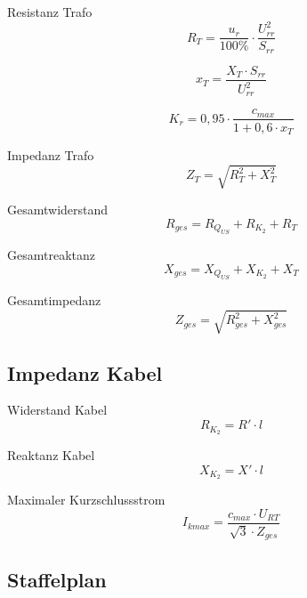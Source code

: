 \documentclass[11pt, a4paper, draft, fleqn, twocolumn]{article}
\numberwithin{equation}{subsection}
\begin{document}
\noindent Resistanz Trafo
\begin{equation}
    R_T = \frac{u_r}{100\%} \cdot \frac{U_{rr}^2}{S_{rr}}
\end{equation}

\noindent 
\begin{equation}
    x_T = \frac{X_T \cdot S_{rr}}{U_{rr}^2}
\end{equation}

\noindent
\begin{equation}
    K_r = 0,95 \cdot \frac{c_{max}}{1 + 0,6 \cdot x_T}
\end{equation}

\noindent Impedanz Trafo
\begin{equation}
    Z_T = \sqrt{R_T^2 + X_T^2}
\end{equation}

\noindent Gesamtwiderstand
\begin{equation}
    R_{ges} = R_{Q_{US}} + R_{K_{2}} + R_T
\end{equation}

\noindent Gesamtreaktanz
\begin{equation}
    X_{ges} = X_{Q_{US}} + X_{K_{2}} + X_T
\end{equation}

\noindent Gesamtimpedanz
\begin{equation}
    Z_{ges} = \sqrt{R_{ges}^2 + X_{ges}^2}
\end{equation}


\subsection{Impedanz Kabel}

Widerstand Kabel
\begin{equation}
    R_{K_{2}} = R' \cdot l
\end{equation}

\noindent Reaktanz Kabel
\begin{equation}
    X_{K_{2}} = X' \cdot l
\end{equation}

\noindent Maximaler Kurzschlussstrom
\begin{equation}
    I_{kmax} = \frac{c_{max} \cdot U_{RT}}{\sqrt{3} \cdot Z_{ges}}
\end{equation}


\subsection{Staffelplan}
\end{document}
